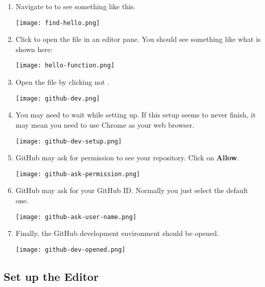 \begin{enumerate}
\item Navigate to  to see something like this.

\noindent\texttt{[image: find-hello.png]}



\item Click  to open the file in an editor pane.  You
  should see something like what is shown here:

\noindent\texttt{[image: hello-function.png]}


\item Open the file by clicking  not .

\noindent\texttt{[image: github-dev.png]}


\item You may need to wait while setting up. If this setup seems to
  never finish, it may mean you need to use Chrome as your web
  browser.

\noindent\texttt{[image: github-dev-setup.png]}


\item GitHub may ask for permission to see your repository.  Click on \textbf{Allow}.
  
\noindent\texttt{[image: github-ask-permission.png]}
  

\item GitHub may ask for your GitHub ID.  Normally you just select the default one.
  
\noindent\texttt{[image: github-ask-user-name.png]}

\item Finally, the GitHub development environment should be opened.
  
\noindent\texttt{[image: github-dev-opened.png]}



\end{enumerate}

\subsection{Set up the Editor}
  
